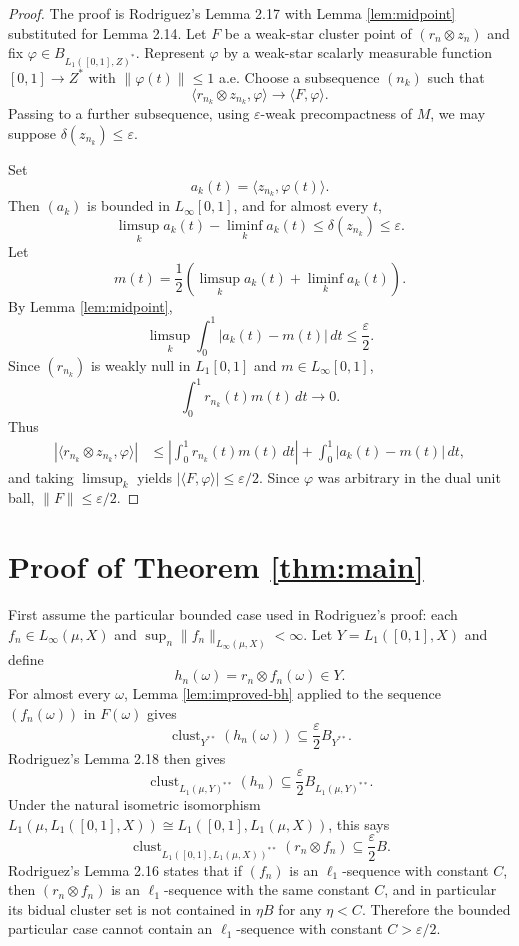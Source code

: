 \documentclass[11pt]{article}
\newcommand{\eps}{\varepsilon}
\newcommand{\sub}{\subseteq}
\newcommand{\clust}{\operatorname{clust}}
\begin{document}
\begin{proof}
The proof is Rodriguez's Lemma 2.17 with Lemma \ref{lem:midpoint} substituted
for Lemma 2.14. Let $F$ be a weak-star cluster point of $(r_n\otimes z_n)$ and
fix $\varphi\in B_{L_1([0,1],Z)^*}$. Represent $\varphi$ by a weak-star
scalarly measurable function $[0,1]\to Z^*$ with $\|\varphi(t)\|\leq 1$ a.e.
Choose a subsequence $(n_k)$ such that
\[
\langle r_{n_k}\otimes z_{n_k},\varphi\rangle\to \langle F,\varphi\rangle.
\]
Passing to a further subsequence, using $\eps$-weak precompactness of $M$, we
may suppose $\delta(z_{n_k})\leq\eps$.

Set
\[
a_k(t)=\langle z_{n_k},\varphi(t)\rangle .
\]
Then $(a_k)$ is bounded in $L_\infty[0,1]$, and for almost every $t$,
\[
\limsup_k a_k(t)-\liminf_k a_k(t)\leq \delta(z_{n_k})\leq\eps.
\]
Let
\[
m(t)=\frac12\left(\limsup_k a_k(t)+\liminf_k a_k(t)\right).
\]
By Lemma \ref{lem:midpoint},
\[
\limsup_k\int_0^1 |a_k(t)-m(t)|\,dt\leq \frac{\eps}{2}.
\]
Since $(r_{n_k})$ is weakly null in $L_1[0,1]$ and $m\in L_\infty[0,1]$,
\[
\int_0^1 r_{n_k}(t)m(t)\,dt\to 0.
\]
Thus
\[
\begin{aligned}
|\langle r_{n_k}\otimes z_{n_k},\varphi\rangle|
&\leq
\left|\int_0^1 r_{n_k}(t)m(t)\,dt\right|
 +\int_0^1 |a_k(t)-m(t)|\,dt,
\end{aligned}
\]
and taking $\limsup_k$ yields
$|\langle F,\varphi\rangle|\leq \eps/2$. Since $\varphi$ was arbitrary in the
dual unit ball, $\|F\|\leq\eps/2$.
\end{proof}

\section*{Proof of Theorem \ref{thm:main}}

First assume the particular bounded case used in Rodriguez's proof: each
$f_n\in L_\infty(\mu,X)$ and $\sup_n\|f_n\|_{L_\infty(\mu,X)}<\infty$.
Let $Y=L_1([0,1],X)$ and define
\[
h_n(\omega)=r_n\otimes f_n(\omega)\in Y.
\]
For almost every $\omega$, Lemma \ref{lem:improved-bh} applied to the sequence
$(f_n(\omega))$ in $F(\omega)$ gives
\[
\clust_{Y^{**}}(h_n(\omega))\sub \frac{\eps}{2}B_{Y^{**}}.
\]
Rodriguez's Lemma 2.18 then gives
\[
\clust_{L_1(\mu,Y)^{**}}(h_n)\sub \frac{\eps}{2}B_{L_1(\mu,Y)^{**}}.
\]
Under the natural isometric isomorphism
$L_1(\mu,L_1([0,1],X))\cong L_1([0,1],L_1(\mu,X))$, this says
\[
\clust_{L_1([0,1],L_1(\mu,X))^{**}}(r_n\otimes f_n)
\sub \frac{\eps}{2}B.
\]
Rodriguez's Lemma 2.16 states that if $(f_n)$ is an $\ell_1$-sequence with
constant $C$, then $(r_n\otimes f_n)$ is an $\ell_1$-sequence with the same
constant $C$, and in particular its bidual cluster set is not contained in
$\eta B$ for any $\eta<C$. Therefore the bounded particular case cannot contain
an $\ell_1$-sequence with constant $C>\eps/2$.
\end{document}

